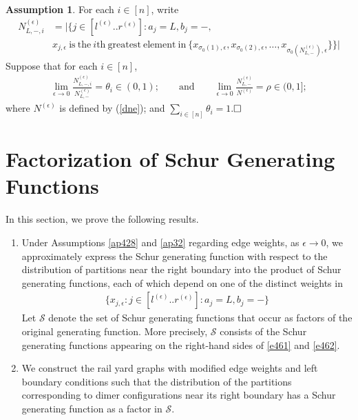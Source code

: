 \documentclass[11pt]{amsart}
\theoremstyle{plain}
\theoremstyle{definition}
\newtheorem{assumption}[theorem]{Assumption}
\theoremstyle{remark}
\newcommand\si{\sigma}
\numberwithin{equation}{section}
\numberwithin{theorem}{section}
\numberwithin{figure}{section}
\begin{document}
\begin{assumption}\label{ap36}For each $i\in[n]$, write
\begin{align*}
N_{L,-,i}^{(\epsilon)}&=|\{j\in [l^{(\epsilon)}..r^{(\epsilon)}]:a_j=L,b_j=-,\\
&x_{j,\epsilon}\ \mathrm{is\ the}\ i\mathrm{th}\ \mathrm{greatest\ element\ in}\ \{x_{\si_0(1),\epsilon},x_{\si_0(2),\epsilon},\ldots,x_{\si_0(N_{L,-}^{(\epsilon)}),\epsilon}\}\}|
\end{align*}
Suppose that for each $i\in[n]$,
\begin{eqnarray*}
\lim_{\epsilon\rightarrow 0}\frac{N_{L,-,i}^{(\epsilon)}}{N_{L,-}^{(\epsilon)}}=\theta_i\in (0,1);\qquad\mathrm{and}\qquad 
\lim_{\epsilon\rightarrow 0}\frac{N_{L,-}^{(\epsilon)}}{N^{(\epsilon)}}=\rho\in (0,1];
\end{eqnarray*}
where $N^{(\epsilon)}$ is defined by (\ref{dne}); and $\sum_{i\in [n]}\theta_i=1$.$\hfill\Box$
\end{assumption}



\section{Factorization of Schur Generating Functions}
\label{sec:gue}

In this section, we prove the following results.
\begin{enumerate}
\item Under Assumptions \ref{ap428} and \ref{ap32} regarding edge weights, as $\epsilon\rightarrow 0$, we approximately express the Schur generating function with respect to the distribution of partitions near the right boundary into the product of Schur generating functions, each of which depend on one of the distinct weights in 
\begin{align*}
\{x_{j,\epsilon}:j\in [l^{(\epsilon)}..r^{(\epsilon)}]:a_j=L,b_j=-\}
\end{align*}
Let $\mathcal{S}$ denote the set of Schur generating functions that occur as factors of the original generating function. More precisely, $\mathcal{S}$ consists of the Schur generating functions appearing on the right-hand sides of \eqref{e461} and \eqref{e462}.

\item We construct the rail yard graphs with modified edge weights and left boundary conditions such that the distribution of the partitions corresponding to dimer configurations near its right boundary has a Schur generating function as a factor in $\mathcal{S}$.

\end{enumerate}
\end{document}
